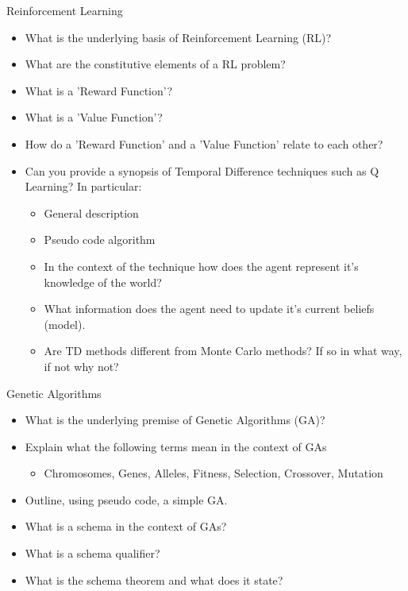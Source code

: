 \documentclass[%
pdf,
colorBG,
slideColor,
tcrico,
]{prosper}
\begin{document}
\begin{slide}{Reinforcement Learning} 
\tiny
\begin{itemize}
\item What is the underlying basis of Reinforcement Learning (RL)?
\item What are the constitutive elements of a RL problem?
\item What is a 'Reward Function'?
\item What is a 'Value Function'?
\item How do a 'Reward Function' and a 'Value Function' relate to each other?
\item Can you provide a synopsis of Temporal Difference techniques such as Q Learning?  In particular:
	\begin{itemize}
	\item General description
	\item Pseudo code algorithm
	\item In the context of the technique how does the agent represent it's knowledge of the world?
	\item What information does the agent need to update it's current beliefs (model). 
	\item Are TD methods different from Monte Carlo methods? If so in what way, if not why not?
	\end{itemize}
\end{itemize}
\end{slide}


\begin{slide}{Genetic Algorithms} 
\tiny
\begin{itemize}
\item What is the underlying premise of Genetic Algorithms (GA)?
\item Explain what the following terms mean in the context of GAs
	\begin{itemize}
	\item Chromosomes, Genes, Alleles, Fitness, Selection, Crossover, Mutation
	\end{itemize}
\item Outline, using pseudo code, a simple GA.
\item What is a schema in the context of GAs?
\item What is a schema qualifier?
\item What is the schema theorem and what does it state?
\end{itemize}
\end{slide}
\end{document}
